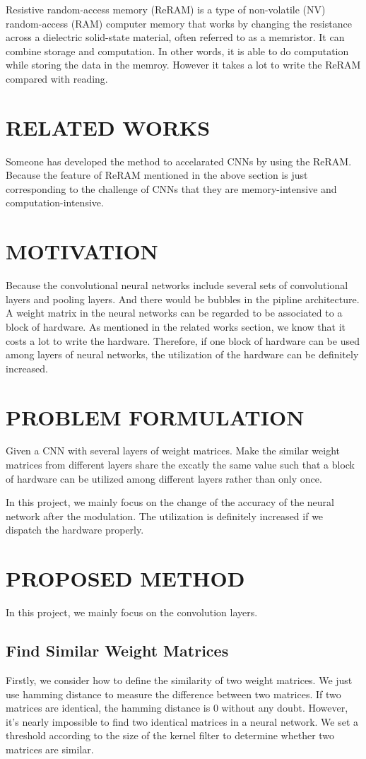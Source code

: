 \documentclass[letterpaper, 10 pt, conference]{ieeeconf}  %
\begin{document}
Resistive random-access memory (ReRAM) is a type of non-volatile (NV) random-access (RAM) computer memory that works by changing the resistance across a dielectric solid-state material, often referred to as a memristor. It can combine storage and computation. In other words, it is able to do computation while storing the data in the memroy. However it takes a lot to write the ReRAM compared with reading.

\section{RELATED WORKS}
Someone has developed the method to accelarated CNNs by using the ReRAM. Because the feature of ReRAM mentioned in the above section is just corresponding to the challenge of CNNs that they are memory-intensive and computation-intensive.

\section{MOTIVATION}
Because the convolutional neural networks include several sets of convolutional layers and pooling layers. And there would be bubbles in the pipline architecture. A weight matrix in the neural networks can be regarded to be associated to a block of hardware. As mentioned in the related works section, we know that it costs a lot to write the hardware. Therefore, if one block of hardware can be used among layers of neural networks, the utilization of the hardware can be definitely increased.

\section{PROBLEM FORMULATION}
Given a CNN with several layers of weight matrices. Make the similar weight matrices from different layers share the excatly the same value such that a block of hardware can be utilized among different layers rather than only once.

In this project, we mainly focus on the change of the accuracy of the neural network after the modulation. The utilization is definitely increased if we dispatch the hardware properly. 
\section{PROPOSED METHOD}
In this project, we mainly focus on the convolution layers.
\subsection{Find Similar Weight Matrices}
Firstly, we consider how to define the similarity of two weight matrices. We just use hamming distance to measure the difference between two matrices. If two matrices are identical, the hamming distance is 0 without any doubt. However, it's nearly impossible to find two identical matrices in a neural network. We set a threshold according to the size of the kernel filter to determine whether two matrices are similar.
\end{document}
